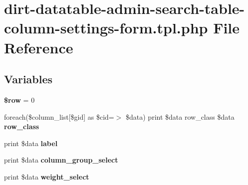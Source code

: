 \hypertarget{dirt-datatable-admin-search-table-column-settings-form_8tpl_8php}{}\section{dirt-\/datatable-\/admin-\/search-\/table-\/column-\/settings-\/form.tpl.\+php File Reference}
\label{dirt-datatable-admin-search-table-column-settings-form_8tpl_8php}
\subsection*{Variables}
\begin{DoxyCompactItemize}
\item 
\mbox{\label{dirt-datatable-admin-search-table-column-settings-form_8tpl_8php_aa1d731aa570613e5bcff831bb10e9b87}} 
{\bfseries \$row} = 0
\item 
\mbox{\label{dirt-datatable-admin-search-table-column-settings-form_8tpl_8php_afcda12cc7faccd5ff8aeb3dca1fbdafa}} 
foreach(\$column\+\_\+list\mbox{[}\$gid\mbox{]} as \$cid=$>$ \$data) print \$data row\+\_\+class \$data {\bfseries row\+\_\+class}
\item 
\mbox{\label{dirt-datatable-admin-search-table-column-settings-form_8tpl_8php_ad56bbd35b0b19a6913ef4b3d7a8a6a36}} 
print \$data {\bfseries label}
\item 
\mbox{\label{dirt-datatable-admin-search-table-column-settings-form_8tpl_8php_a33a9a112f88b6625677b55289493f151}} 
print \$data {\bfseries column\+\_\+group\+\_\+select}
\item 
\mbox{\label{dirt-datatable-admin-search-table-column-settings-form_8tpl_8php_a1317c2a993afcc9094c904696bf545a3}} 
print \$data {\bfseries weight\+\_\+select}
\item 
\mbox{\label{dirt-datatable-admin-search-table-column-settings-form_8tpl_8php_a03031d3351e6cbc55033e27d4c9676e2}} 

\end{DoxyCompactItemize}
